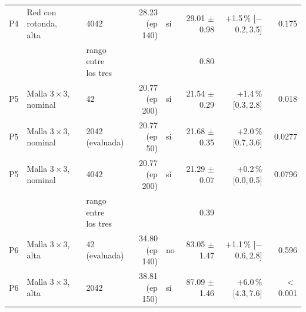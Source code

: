 \begin{table}[H]
\begin{tabular}{lllrlrrr}
P4 & \makecell[l]{Red con rotonda,\\{}alta} & 4042 & \makecell[r]{28.23\\{}(ep 140)} & sí & \makecell[r]{29.01\\{}$\pm$ 0.98} & \makecell[r]{+1.5\,\%\\{}[$-$0.2,\,3.5]} & 0.175 \\
 & & \makecell[l]{rango entre\\{}los tres} & & & 0.80 & & \\
P5 & \makecell[l]{Malla $3 \times 3$,\\{}nominal} & 42 & \makecell[r]{20.77\\{}(ep 200)} & sí & \makecell[r]{21.54\\{}$\pm$ 0.29} & \makecell[r]{+1.4\,\%\\{}[0.3,\,2.8]} & 0.018 \\
P5 & \makecell[l]{Malla $3 \times 3$,\\{}nominal} & \makecell[l]{2042\\{}(evaluada)} & \makecell[r]{20.77\\{}(ep 50)} & sí & \makecell[r]{21.68\\{}$\pm$ 0.35} & \makecell[r]{+2.0\,\%\\{}[0.7,\,3.6]} & 0.0277 \\
P5 & \makecell[l]{Malla $3 \times 3$,\\{}nominal} & 4042 & \makecell[r]{20.77\\{}(ep 200)} & sí & \makecell[r]{21.29\\{}$\pm$ 0.07} & \makecell[r]{+0.2\,\%\\{}[0.0,\,0.5]} & 0.0796 \\
 & & \makecell[l]{rango entre\\{}los tres} & & & 0.39 & & \\
P6 & \makecell[l]{Malla $3 \times 3$,\\{}alta} & \makecell[l]{42\\{}(evaluada)} & \makecell[r]{34.80\\{}(ep 140)} & no & \makecell[r]{83.05\\{}$\pm$ 1.47} & \makecell[r]{+1.1\,\%\\{}[$-$0.6,\,2.8]} & 0.596 \\
P6 & \makecell[l]{Malla $3 \times 3$,\\{}alta} & 2042 & \makecell[r]{38.81\\{}(ep 150)} & sí & \makecell[r]{87.09\\{}$\pm$ 1.46} & \makecell[r]{+6.0\,\%\\{}[4.3,\,7.6]} & $<$\,0.001 \\

\end{tabular}
\end{table}
